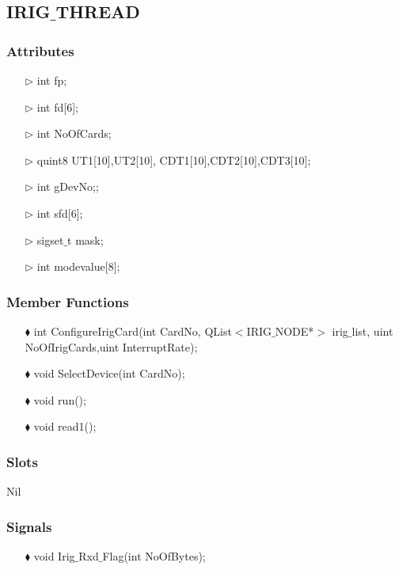 \subsection{IRIG$\_$THREAD}
\subsubsection{Attributes}
\begin{enumerate}
	\item [$\rhd$] int fp;
	\item [$\rhd$] int fd[6]; 
	\item [$\rhd$] int NoOfCards;
	\item [$\rhd$] quint8 UT1[10],UT2[10], CDT1[10],CDT2[10],CDT3[10];
	\item [$\rhd$] int gDevNo;;
	\item [$\rhd$] int sfd[6];
	\item [$\rhd$] sigset$\_$t mask;
	\item [$\rhd$] int modevalue[8];
\end{enumerate}


\subsubsection{Member Functions }
\begin{enumerate}
	\item [$\blacklozenge$] int ConfigureIrigCard(int CardNo, QList$<$IRIG$\_$NODE*$>$ irig$\_$list, uint NoOfIrigCards,uint InterruptRate);	
	\item [$\blacklozenge$] void SelectDevice(int CardNo);
	\item [$\blacklozenge$] void run();
	\item [$\blacklozenge$] void read1();

	
\end{enumerate}
\subsubsection{Slots}
Nil


\subsubsection{Signals}
\begin{enumerate}

	\item [$\blacklozenge$] void Irig$\_$Rxd$\_$Flag(int NoOfBytes);

\end{enumerate}
